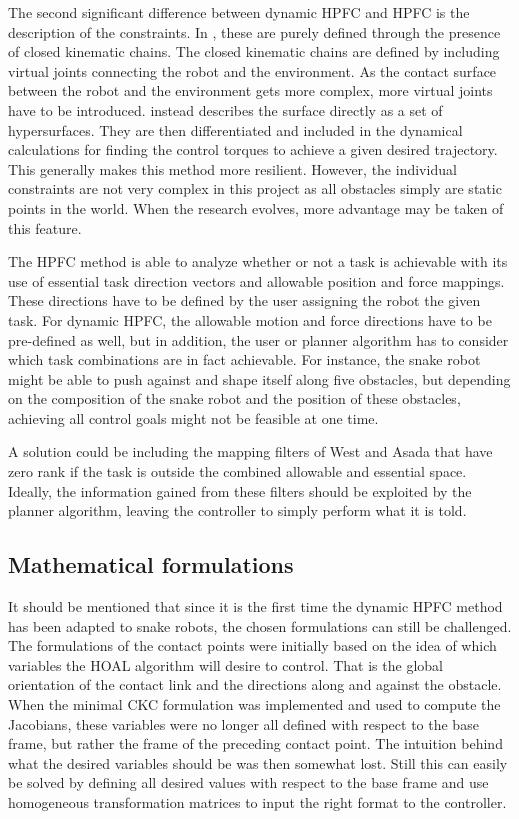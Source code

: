 The second significant difference between dynamic HPFC and HPFC is the description of the constraints. In \cite{west1985method}, these are purely defined through the presence of closed kinematic chains. The closed kinematic chains are defined by including virtual joints connecting the robot and the environment. As the contact surface between the robot and the environment gets more complex, more virtual joints have to be introduced. \cite{yoshikawa1987dynamic} instead describes the surface directly as a set of hypersurfaces. They are then differentiated and included in the dynamical calculations for finding the control torques to achieve a given desired trajectory. This generally makes this method more resilient. However, the individual constraints are not very complex in this project as all obstacles simply are static points in the world. When the research evolves, more advantage may be taken of this feature.

The HPFC method is able to analyze whether or not a task is achievable with its use of essential task direction vectors and allowable position and force mappings. These directions have to be defined by the user assigning the robot the given task. For dynamic HPFC, the allowable motion and force directions have to be pre-defined as well, but in addition, the user or planner algorithm has to consider which task combinations are in fact achievable. For instance, the snake robot might be able to push against and shape itself along five obstacles, but depending on the composition of the snake robot and the position of these obstacles, achieving all control goals might not be feasible at one time. 

A solution could be including the mapping filters of West and Asada \cite{west1985method} that have zero rank if the task is outside the combined allowable and essential space. Ideally, the information gained from these filters should be exploited by the planner algorithm, leaving the controller to simply perform what it is told.

\subsection{Mathematical formulations}

It should be mentioned that since it is the first time the dynamic HPFC method has been adapted to snake robots, the chosen formulations can still be challenged. The formulations of the contact points were initially based on the idea of which variables the HOAL algorithm will desire to control. That is the global orientation of the contact link and the directions along and against the obstacle. When the minimal CKC formulation was implemented and used to compute the Jacobians, these variables were no longer all defined with respect to the base frame, but rather the frame of the preceding contact point. The intuition behind what the desired variables should be was then somewhat lost. Still this can easily be solved by defining all desired values with respect to the base frame and use homogeneous transformation matrices to input the right format to the controller.

